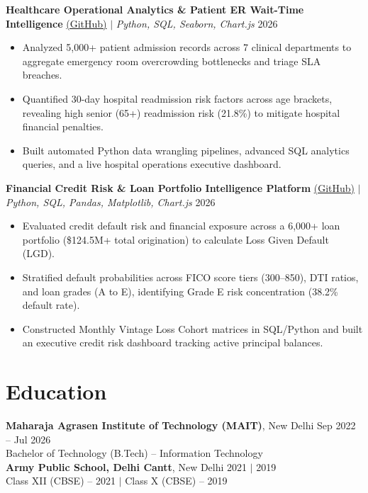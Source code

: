 \documentclass[a4paper,10pt]{article}
\begin{document}
\vspace{4pt}
\textbf{Healthcare Operational Analytics \& Patient ER Wait-Time Intelligence} \href{https://github.com/TusharJoshi7/Healthcare-Operations-Patient-Analytics}{\color{accent}(GitHub)} $|$ \textit{Python, SQL, Seaborn, Chart.js} \hfill 2026
\begin{itemize}
    \item Analyzed 5,000+ patient admission records across 7 clinical departments to aggregate emergency room overcrowding bottlenecks and triage SLA breaches.
    \item Quantified 30-day hospital readmission risk factors across age brackets, revealing high senior (65+) readmission risk (21.8\%) to mitigate hospital financial penalties.
    \item Built automated Python data wrangling pipelines, advanced SQL analytics queries, and a live hospital operations executive dashboard.
\end{itemize}

\vspace{4pt}
\textbf{Financial Credit Risk \& Loan Portfolio Intelligence Platform} \href{https://github.com/TusharJoshi7/Financial-Credit-Risk-Analytics}{\color{accent}(GitHub)} $|$ \textit{Python, SQL, Pandas, Matplotlib, Chart.js} \hfill 2026
\begin{itemize}
    \item Evaluated credit default risk and financial exposure across a 6,000+ loan portfolio (\$124.5M+ total origination) to calculate Loss Given Default (LGD).
    \item Stratified default probabilities across FICO score tiers (300--850), DTI ratios, and loan grades (A to E), identifying Grade E risk concentration (38.2\% default rate).
    \item Constructed Monthly Vintage Loss Cohort matrices in SQL/Python and built an executive credit risk dashboard tracking active principal balances.
\end{itemize}

\section{Education}
\textbf{Maharaja Agrasen Institute of Technology (MAIT)}, New Delhi \hfill Sep 2022 -- Jul 2026 \\
Bachelor of Technology (B.Tech) -- Information Technology \\
\textbf{Army Public School, Delhi Cantt}, New Delhi \hfill 2021 $|$ 2019 \\
Class XII (CBSE) -- 2021 $|$ Class X (CBSE) -- 2019
\end{document}
